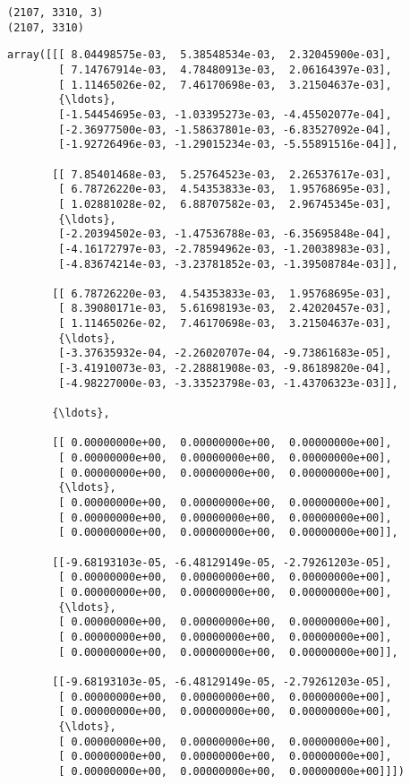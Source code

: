 \documentclass[11pt]{article}
\makeatletter
\newcommand{\boxspacing}{\kern\kvtcb@left@rule\kern\kvtcb@boxsep}
\newcommand{\prompt}[4]{
        {\ttfamily\llap{{\color{#2}[#3]:\hspace{3pt}#4}}\vspace{-\baselineskip}}
    }
\makeatother
\begin{document}
    \begin{Verbatim}[commandchars=\\\{\}]
(2107, 3310, 3)
(2107, 3310)
    \end{Verbatim}

            \begin{tcolorbox}[breakable, size=fbox, boxrule=.5pt, pad at break*=1mm, opacityfill=0]
\prompt{Out}{outcolor}{232}{\boxspacing}
\begin{Verbatim}[commandchars=\\\{\}]
array([[[ 8.04498575e-03,  5.38548534e-03,  2.32045900e-03],
        [ 7.14767914e-03,  4.78480913e-03,  2.06164397e-03],
        [ 1.11465026e-02,  7.46170698e-03,  3.21504637e-03],
        {\ldots},
        [-1.54454695e-03, -1.03395273e-03, -4.45502077e-04],
        [-2.36977500e-03, -1.58637801e-03, -6.83527092e-04],
        [-1.92726496e-03, -1.29015234e-03, -5.55891516e-04]],

       [[ 7.85401468e-03,  5.25764523e-03,  2.26537617e-03],
        [ 6.78726220e-03,  4.54353833e-03,  1.95768695e-03],
        [ 1.02881028e-02,  6.88707582e-03,  2.96745345e-03],
        {\ldots},
        [-2.20394502e-03, -1.47536788e-03, -6.35695848e-04],
        [-4.16172797e-03, -2.78594962e-03, -1.20038983e-03],
        [-4.83674214e-03, -3.23781852e-03, -1.39508784e-03]],

       [[ 6.78726220e-03,  4.54353833e-03,  1.95768695e-03],
        [ 8.39080171e-03,  5.61698193e-03,  2.42020457e-03],
        [ 1.11465026e-02,  7.46170698e-03,  3.21504637e-03],
        {\ldots},
        [-3.37635932e-04, -2.26020707e-04, -9.73861683e-05],
        [-3.41910073e-03, -2.28881908e-03, -9.86189820e-04],
        [-4.98227000e-03, -3.33523798e-03, -1.43706323e-03]],

       {\ldots},

       [[ 0.00000000e+00,  0.00000000e+00,  0.00000000e+00],
        [ 0.00000000e+00,  0.00000000e+00,  0.00000000e+00],
        [ 0.00000000e+00,  0.00000000e+00,  0.00000000e+00],
        {\ldots},
        [ 0.00000000e+00,  0.00000000e+00,  0.00000000e+00],
        [ 0.00000000e+00,  0.00000000e+00,  0.00000000e+00],
        [ 0.00000000e+00,  0.00000000e+00,  0.00000000e+00]],

       [[-9.68193103e-05, -6.48129149e-05, -2.79261203e-05],
        [ 0.00000000e+00,  0.00000000e+00,  0.00000000e+00],
        [ 0.00000000e+00,  0.00000000e+00,  0.00000000e+00],
        {\ldots},
        [ 0.00000000e+00,  0.00000000e+00,  0.00000000e+00],
        [ 0.00000000e+00,  0.00000000e+00,  0.00000000e+00],
        [ 0.00000000e+00,  0.00000000e+00,  0.00000000e+00]],

       [[-9.68193103e-05, -6.48129149e-05, -2.79261203e-05],
        [ 0.00000000e+00,  0.00000000e+00,  0.00000000e+00],
        [ 0.00000000e+00,  0.00000000e+00,  0.00000000e+00],
        {\ldots},
        [ 0.00000000e+00,  0.00000000e+00,  0.00000000e+00],
        [ 0.00000000e+00,  0.00000000e+00,  0.00000000e+00],
        [ 0.00000000e+00,  0.00000000e+00,  0.00000000e+00]]])
\end{Verbatim}
\end{tcolorbox}
        
\end{document}
